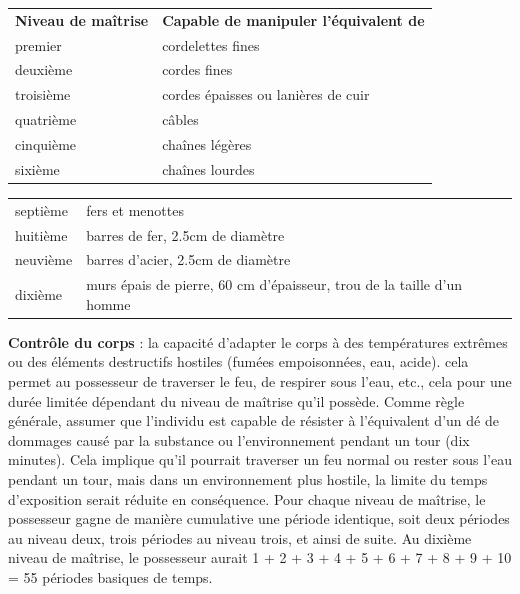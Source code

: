 \documentclass[11pt]{article}
\begin{document}
{\bigskip

\begin{tabular}{>{\centering\arraybackslash}p{3cm}>{\centering\arraybackslash}p{11.7cm}}
\textbf{Niveau de maîtrise} & \textbf{Capable de manipuler l'équivalent de} \\
premier    & cordelettes fines \\
deuxième   & cordes fines \\
troisième  & cordes épaisses ou lanières de cuir\\
quatrième  & câbles \\
cinquième  & chaînes légères \\
sixième    & chaînes lourdes \\
\end{tabular}

\begin{tabular}{>{\centering\arraybackslash}p{3cm}>{\centering\arraybackslash}p{11.7cm}}
septième   & fers et menottes\\
huitième   & barres de fer, 2.5cm de diamètre\\
neuvième   & barres d'acier, 2.5cm de diamètre \\
dixième    & murs épais de pierre, 60 cm d'épaisseur, trou de la taille d'un homme \\
\end{tabular}

\bigskip

\textbf{Contrôle du corps} : la capacité d'adapter le corps à des températures extrêmes ou des éléments destructifs hostiles (fumées empoisonnées, eau, acide). cela permet au possesseur de traverser le feu, de respirer sous l'eau, etc., cela pour une durée limitée dépendant du niveau de maîtrise qu'il possède. Comme règle générale, assumer que l'individu est capable de résister à l'équivalent d'un dé de dommages causé par la substance ou l'environnement pendant un tour (dix minutes). Cela implique qu'il pourrait traverser un feu normal ou rester sous l'eau pendant un tour, mais dans un environnement plus hostile, la limite du temps d'exposition serait réduite en conséquence. Pour chaque niveau de maîtrise, le possesseur gagne de manière cumulative une période identique, soit deux périodes au niveau deux, trois périodes au niveau trois, et ainsi de suite. Au dixième niveau de maîtrise, le possesseur aurait 1 + 2 + 3 + 4 + 5 + 6 + 7 + 8 + 9 + 10 = 55 périodes basiques de temps.

}
\end{document}
